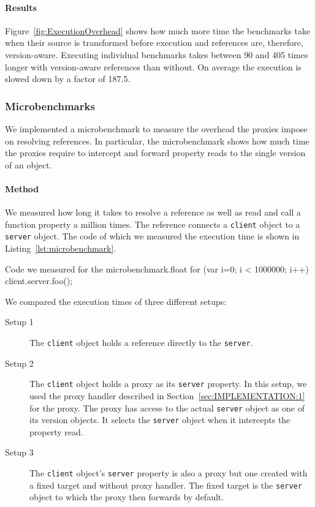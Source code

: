 \paragraph{Results}
Figure~\ref{fig:ExecutionOverhead} shows how much more time the benchmarks take when their source is transformed before execution and references are, therefore, version-aware.
Executing individual benchmarks takes between 90 and 405 times longer with version-aware references than without.
On average the execution is slowed down by a factor of 187.5.


\subsubsection{Microbenchmarks}

We implemented a microbenchmark to measure the overhead the proxies impose on resolving references.
In particular, the microbenchmark shows how much time the proxies require to intercept and forward property reads to the single version of an object.

\paragraph{Method}
We measured how long it takes to resolve a reference as well as read and call a function property a million times.
The reference connects a \lstinline{client} object to a \lstinline{server} object.
The code of which we measured the execution time is shown in Listing~\ref{lst:microbenchmark}.

\begin{code}{Code we measured for the microbenchmark.}{float}
for (var i=0; i < 1000000; i++) {
    client.server.foo();
} 
\end{code}
\iffalse
\end{verbatim}\fi

We compared the execution times of three different setups:

\begin{description}
    \item[Setup 1] The \lstinline{client} object holds a reference directly to the \lstinline{server}.
    \item[Setup 2] The \lstinline{client} object holds a proxy as its \lstinline{server} property. In this setup, we used the proxy handler described in Section~\ref{sec:IMPLEMENTATION:1} for the proxy. The proxy has access to the actual \lstinline{server} object as one of its version objects. It selects the \lstinline{server} object when it intercepts the property read.
    \item[Setup 3] The \lstinline{client} object's \lstinline{server} property is also a proxy but one created with a fixed target and without proxy handler. The fixed target is the \lstinline{server} object to which the proxy then forwards by default.
\end{description}

